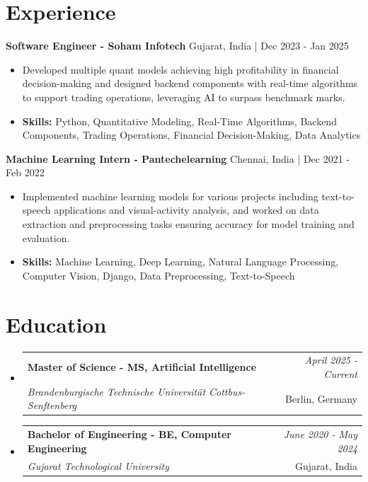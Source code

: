\documentclass[a4paper,11pt]{article}
\makeatletter
\newcommand{\resumeSubheading}[4]{
\vspace{0.5mm}\item
    \begin{tabular*}{\linewidth}[t]{l@{\extracolsep{\fill}}r}
        \textbf{#1} & \textit{\footnotesize{#4}} \\
        \textit{\footnotesize{#3}} &  \footnotesize{#2}\\
    \end{tabular*}
    \vspace{-2.4mm}
}
\makeatother
\begin{document}
\section{\textbf{Experience}}


\vspace{1mm}
  \textbf{Software Engineer - Soham Infotech} \hfill Gujarat, India | Dec 2023 - Jan 2025
\vspace{-1.5mm} %
\begin{itemize}
  \item Developed multiple quant models achieving high profitability in financial decision-making and designed backend components with real-time algorithms to support trading operations, leveraging AI to surpass benchmark marks.

\vspace{-2mm}
  \item \textbf{Skills:} Python, Quantitative Modeling, Real-Time Algorithms, Backend Components, Trading Operations, Financial Decision-Making, Data Analytics
\end{itemize}

\vspace{1mm}
  \textbf{Machine Learning Intern - Pantechelearning} \hfill Chennai, India | Dec 2021 - Feb 2022
\vspace{-1.5mm} %
\begin{itemize}
  \item Implemented machine learning models for various projects including text-to-speech applications and visual-activity analysis, and worked on data extraction and preprocessing tasks ensuring accuracy for model training and evaluation.
\vspace{-2mm}
  \item \textbf{Skills:} Machine Learning, Deep Learning, Natural Language Processing, Computer Vision, Django, Data Preprocessing, Text-to-Speech
\end{itemize}\section{\textbf{Education}}
\vspace{-0.4mm}

\begin{itemize}[leftmargin=0.15in, label={}]
\resumeSubheading
{Master of Science - MS, Artificial Intelligence }{Berlin, Germany}
{Brandenburgische Technische Universität Cottbus-Senftenberg  }{April 2025 - Current}

\vspace{1.0mm} %
\resumeSubheading
{Bachelor of Engineering - BE, Computer Engineering  }{Gujarat, India}
{Gujarat Technological University }{June 2020 - May 2024}

\end{itemize}
\end{document}
